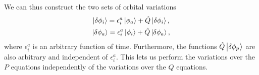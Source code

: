             We can thus construct the two sets of orbital variations
            \begin{gather}
                \ket{\delta\phi_i}
                = \epsilon^{a}_{i}\ket{\phi_a}
                + \hat{Q}\ket{\delta\phi_i},
                \\
                \ket{\delta\phi_a}
                = \epsilon^{a}_{i}\ket{\phi_i}
                + \hat{Q}\ket{\delta\phi_a},
            \end{gather}
            where $\epsilon^{a}_{i}$ is an arbitrary function of time.
            Furthermore, the functions $\hat{Q}\ket{\delta\phi_p}$ are also
            arbitrary and independent of $\epsilon^{a}_{i}$.
            This lets us perform the variations over the $P$ equations
            independently of the variations over the $Q$ equations.

